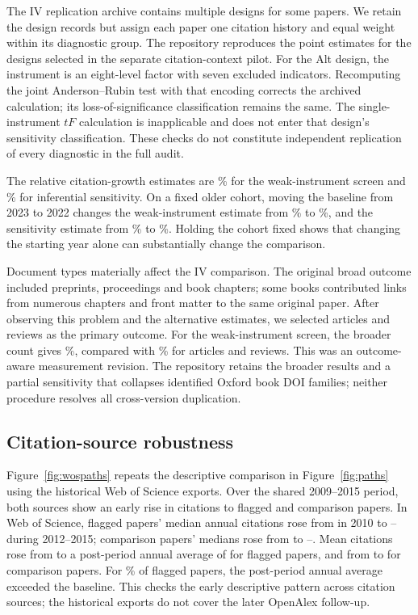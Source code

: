 \documentclass[11pt,letterpaper]{article}
\begin{document}
The IV replication archive contains multiple designs for some papers. We retain the design records but assign each paper one citation history and equal weight within its diagnostic group. The repository reproduces the point estimates for the \LalVerifiedDesigns{} designs selected in the separate citation-context pilot. For the Alt design, the instrument is an eight-level factor with seven excluded indicators. Recomputing the joint Anderson--Rubin test with that encoding corrects the archived calculation; its loss-of-significance classification remains the same. The single-instrument $tF$ calculation is inapplicable and does not enter that design's sensitivity classification. These checks do not constitute independent replication of every diagnostic in the full audit.

The relative citation-growth estimates are \LalWeakChange\% for the weak-instrument screen and \LalSensitiveChange\% for inferential sensitivity. On a fixed older cohort, moving the baseline from 2023 to 2022 changes the weak-instrument estimate from \LalWeakOlderBaseline\% to \LalWeakAlternate\%, and the sensitivity estimate from \LalSensitiveOlderBaseline\% to \LalSensitiveAlternate\%. Holding the cohort fixed shows that changing the starting year alone can substantially change the comparison.

Document types materially affect the IV comparison. The original broad outcome included preprints, proceedings and book chapters; some books contributed links from numerous chapters and front matter to the same original paper. After observing this problem and the alternative estimates, we selected articles and reviews as the primary outcome. For the weak-instrument screen, the broader count gives \LalWeakBroad\%, compared with \LalWeakChange\% for articles and reviews. This was an outcome-aware measurement revision. The repository retains the broader results and a partial sensitivity that collapses identified Oxford book DOI families; neither procedure resolves all cross-version duplication.

\subsection{Citation-source robustness}
Figure~\ref{fig:wospaths} repeats the descriptive comparison in Figure~\ref{fig:paths} using the historical Web of Science exports. Over the shared 2009--2015 period, both sources show an early rise in citations to flagged and comparison papers. In Web of Science, flagged papers' median annual citations rose from \MedianFlaggedBefore{} in 2010 to \MedianFlaggedMin--\MedianFlaggedMax{} during 2012--2015; comparison papers' medians rose from \MedianComparisonBefore{} to \MedianComparisonMin--\MedianComparisonMax. Mean citations rose from \FlaggedBefore{} to a post-period annual average of \FlaggedAfter{} for flagged papers, and from \ComparisonBefore{} to \ComparisonAfter{} for comparison papers. For \IncreasedPercent\% of flagged papers, the post-period annual average exceeded the baseline. This checks the early descriptive pattern across citation sources; the historical exports do not cover the later OpenAlex follow-up.
\end{document}
